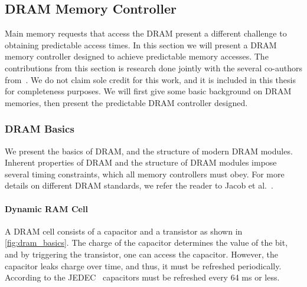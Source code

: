 \subsection{DRAM Memory Controller}
Main memory requests that access the DRAM present a different challenge to obtaining predictable access times.
In this section we will present a DRAM memory controller designed to achieve predictable memory accesses. 
The contributions from this section is research done jointly with the several co-authors from~\cite{ReinekeLiuPatelKimLee11_PRETDRAMControllerBankPrivatizationForPredictability}. 
We do not claim sole credit for this work, and it is included in this thesis for completeness purposes. 
We will first give some basic background on DRAM memories, then present the predictable DRAM controller designed.

\subsubsection{DRAM Basics}

We present the basics of DRAM, and the structure of modern DRAM modules.
Inherent properties of DRAM and the structure of DRAM modules impose several timing constraints, which all memory controllers must obey.
For more details on different DRAM standards, we refer the reader to Jacob et al.~\cite{JaNgWa07}.

 
\paragraph{Dynamic RAM Cell} A DRAM cell consists of a capacitor and a transistor as shown in \ref{fig:dram_basics}.
 The charge of the capacitor determines the value of the bit, and by triggering the transistor, one can access the capacitor.
However, the capacitor leaks charge over time, and thus, it must be refreshed periodically.
According to the JEDEC~\cite{jedec} capacitors must be refreshed every 64 ms or less.



